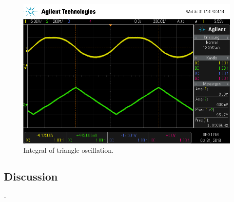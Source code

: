 \begin{figure}
  \centering
  \includegraphics[scale=0.5]{scope_3.png}
  \caption{Integral of triangle-oscillation.}
  \label{abb:2}
\end{figure}

\subsection{Discussion}
- 

\printbibliography
